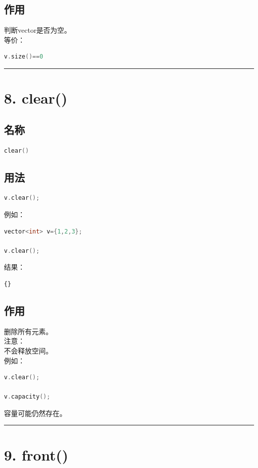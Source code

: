 \documentclass[9pt,twocolumn]{extarticle}
\begin{document}
\subsection{作用}
判断vector是否为空。\\
等价：
\begin{lstlisting}[language=C++]
v.size()==0
\end{lstlisting}

\noindent\rule{\linewidth}{0.4pt}

\section{8. clear()}

\subsection{名称}
\begin{lstlisting}[language=C++]
clear()
\end{lstlisting}

\subsection{用法}
\begin{lstlisting}[language=C++]
v.clear();
\end{lstlisting}
例如：
\begin{lstlisting}[language=C++]
vector<int> v={1,2,3};

v.clear();
\end{lstlisting}
结果：
\begin{lstlisting}
{}
\end{lstlisting}

\subsection{作用}
删除所有元素。\\
注意：\\
不会释放空间。\\
例如：
\begin{lstlisting}[language=C++]
v.clear();

v.capacity();
\end{lstlisting}
容量可能仍然存在。

\noindent\rule{\linewidth}{0.4pt}

\section{9. front()}
\end{document}
